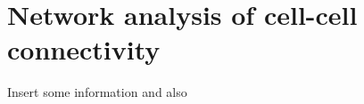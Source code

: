 \documentclass[../main.tex]{subfiles}
\begin{document}
\chapter{Network analysis of cell-cell connectivity}
\label{cha:networking}

Insert some information \cite{basselMulticellularSystemsBiology2019} and also \cite{hughesNonDestructiveHighContentAnalysis2017}
\end{document}
